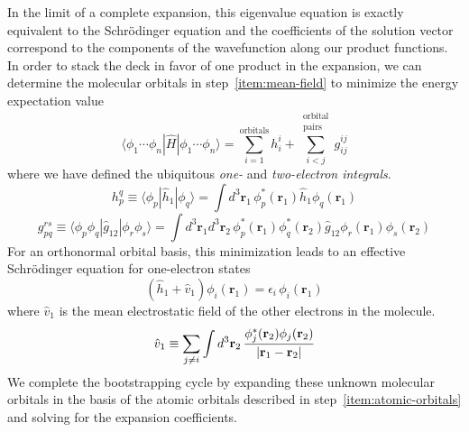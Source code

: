 In the limit of a complete expansion, this eigenvalue equation is exactly
equivalent to the Schr\"odinger equation and the coefficients of the solution
vector correspond to the components of the wavefunction along our product
functions.
In order to stack the deck in favor of one product in the expansion, we can
determine the molecular orbitals in step~\ref{item:mean-field} to minimize the
energy expectation value
\begin{equation}
    \label{eq:introduction:orbital-product-expectation-value}
    \langle \phi_1\cdots \phi_n|
    \hat{H}
    |\phi_1\cdots \phi_n \rangle
    =
    \sum_{i=1}^\mathrm{orbitals}
    h_i^i
    +
    \sum_{i<j}^{\substack{\mathrm{orbital}\\\mathrm{pairs}}}
    g_{ij}^{ij}
\end{equation}
where we have defined the ubiquitous {\itshape one-} and {\itshape two-electron
integrals}.
\begin{equation}
    h_p^q
    \equiv
    \langle\phi_p|\hat{h}_1|\phi_q\rangle
    =
    \int
    d^3\mathbf{r}_1\,
    \phi_p^*(\mathbf{r}_1)
    \hat{h}_1
    \phi_q(\mathbf{r}_1)
\end{equation}
\begin{equation}
    g_{pq}^{rs}
    \equiv
    \langle\phi_p\phi_q|\hat{g}_{12}|\phi_r\phi_s\rangle
    =
    \int
    d^3\mathbf{r}_1
    d^3\mathbf{r}_2\,
    \phi_p^*(\mathbf{r}_1)
    \phi_q^*(\mathbf{r}_2)
    \hat{g}_{12}
    \phi_r(\mathbf{r}_1)
    \phi_s(\mathbf{r}_2)
\end{equation}
For an orthonormal orbital basis, this minimization leads to an effective
Schr\"odinger equation for one-electron states
\begin{equation}
    \label{eq:introduction:mean-field-orbitals}
    (
        \hat{h}_1
        +
        \hat{v}_1
    )
    \phi_i(\mathbf{r}_1)
    =
    \epsilon_i\,
    \phi_i(\mathbf{r}_1)
\end{equation}
where \(\hat{v}_1\) is the mean electrostatic field of the other electrons in
the molecule.
\begin{equation}
    \hat{v}_1
    \equiv
    \sum_{j\neq i}
    \int
    d^3\mathbf{r}_2\,
    \frac{%
        \phi_j^*(\mathbf{r}_2)\phi_j(\mathbf{r}_2)
    }{%
        |\mathbf{r}_1 - \mathbf{r}_2|
    }
\end{equation}
We complete the bootstrapping cycle by expanding these unknown molecular
orbitals in the basis of the atomic orbitals described in
step~\ref{item:atomic-orbitals} and solving for the expansion coefficients.

